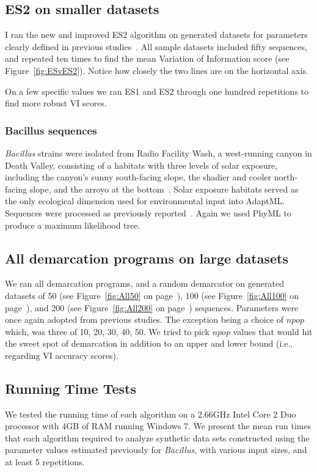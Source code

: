 \subsection*{ES2 on smaller datasets}
I ran the new and improved ES2 algorithm on generated datasets for parameters clearly defined in previous studies~\cite{carlo}.
All sample datasets included fifty sequences, and repeated ten times to find the mean Variation of Information score (see Figure~\ref{fig:ESvES2}).
Notice how closely the two lines are on the horizontal axis.

On a few specific values we ran ES1 and ES2 through one hundred repetitions to find more robust VI scores.

\subsubsection*{Bacillus sequences}
\emph{Bacillus} strains were isolated from Radio Facility Wash, a west-running canyon in Death Valley, consisting of a habitats with three levels of solar exposure, including the canyon's sunny south-facing slope, the shadier and cooler north-facing slope, and the arroyo at the bottom~\cite{connor2010ecology}.
Solar exposure habitats served as the only ecological dimension used for environmental input into AdaptML.
Sequences were processed as previously reported~\cite{carlo}.
Again we used PhyML to produce a maximum likelihood tree.

\subsection*{All demarcation programs on large datasets}
We ran all demarcation programs, and a random demarcator on generated datasets of 50 (see Figure~\ref{fig:All50} on page~\pageref{fig:All50}), 100 (see Figure~\ref{fig:All100} on page~\pageref{fig:All100}), and 200 (see Figure~\ref{fig:All200} on page~\pageref{fig:All200}) sequences.
Parameters were once again adopted from previous studies.
The exception being a choice of $npop$ which, was three of 10, 20, 30, 40, 50.
We tried to pick $npop$ values that would hit the sweet spot of demarcation in addition to an upper and lower bound (i.e., regarding VI accuracy scores).

\subsection*{Running Time Tests}
We tested the running time of each algorithm on a 2.66GHz Intel Core 2 Duo processor with 4GB of RAM running Windows 7.
We present the mean run times that each algorithm required to analyze synthetic data sets constructed using the parameter values estimated previously for \emph{Bacillus}, with various input sizes, and at least 5 repetitions.

